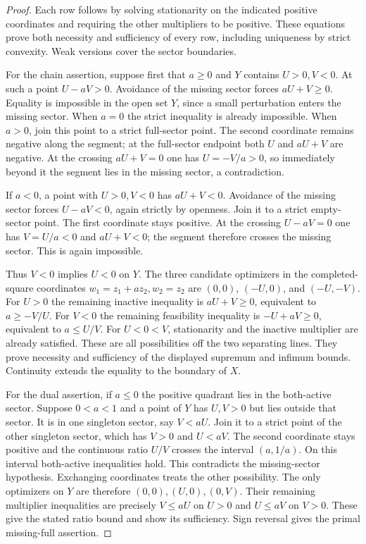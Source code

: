 \begin{proof}
Each row follows by solving stationarity on the indicated positive coordinates and requiring the other multipliers to be positive. These equations prove both necessity and sufficiency of every row, including uniqueness by strict convexity. Weak versions cover the sector boundaries.

For the chain assertion, suppose first that $a\ge0$ and $Y$ contains $U>0,V<0$. At such a point $U-aV>0$. Avoidance of the missing sector forces $aU+V\ge0$. Equality is impossible in the open set $Y$, since a small perturbation enters the missing sector. When $a=0$ the strict inequality is already impossible. When $a>0$, join this point to a strict full-sector point. The second coordinate remains negative along the segment; at the full-sector endpoint both $U$ and $aU+V$ are negative. At the crossing $aU+V=0$ one has $U=-V/a>0$, so immediately beyond it the segment lies in the missing sector, a contradiction.

If $a<0$, a point with $U>0,V<0$ has $aU+V<0$. Avoidance of the missing sector forces $U-aV<0$, again strictly by openness. Join it to a strict empty-sector point. The first coordinate stays positive. At the crossing $U-aV=0$ one has $V=U/a<0$ and $aU+V<0$; the segment therefore crosses the missing sector. This is again impossible.

Thus $V<0$ implies $U<0$ on $Y$. The three candidate optimizers in the completed-square coordinates $w_1=z_1+az_2,w_2=z_2$ are $(0,0)$, $(-U,0)$, and $(-U,-V)$. For $U>0$ the remaining inactive inequality is $aU+V\ge0$, equivalent to $a\ge -V/U$. For $V<0$ the remaining feasibility inequality is $-U+aV\ge0$, equivalent to $a\le U/V$. For $U<0<V$, stationarity and the inactive multiplier are already satisfied. These are all possibilities off the two separating lines. They prove necessity and sufficiency of the displayed supremum and infimum bounds. Continuity extends the equality to the boundary of $X$.

For the dual assertion, if $a\le0$ the positive quadrant lies in the both-active sector. Suppose $0<a<1$ and a point of $Y$ has $U,V>0$ but lies outside that sector. It is in one singleton sector, say $V<aU$. Join it to a strict point of the other singleton sector, which has $V>0$ and $U<aV$. The second coordinate stays positive and the continuous ratio $U/V$ crosses the interval $(a,1/a)$. On this interval both-active inequalities hold. This contradicts the missing-sector hypothesis. Exchanging coordinates treats the other possibility. The only optimizers on $Y$ are therefore $(0,0),(U,0),(0,V)$. Their remaining multiplier inequalities are precisely $V\le aU$ on $U>0$ and $U\le aV$ on $V>0$. These give the stated ratio bound and show its sufficiency. Sign reversal gives the primal missing-full assertion.
\end{proof}

